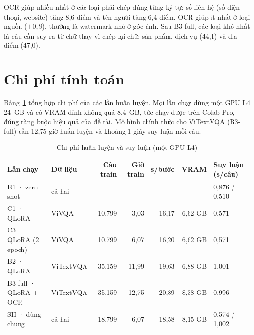 OCR giúp nhiều nhất ở các loại phải chép đúng từng ký tự: số liên hệ (số điện
thoại, website) tăng 8,6 điểm và tên người tăng 6,4 điểm. OCR giúp ít nhất ở loại
nguồn ($+0{,}9$), thường là watermark nhỏ ở góc ảnh. Sau B3-full, các loại khó
nhất là câu cần suy ra từ chữ thay vì chép lại chữ: sản phẩm, dịch vụ (44,1) và
địa điểm (47,0).

\section{Chi phí tính toán}
\label{sec:res-cost}

Bảng~\ref{tab:res-cost} tổng hợp chi phí của các lần huấn luyện. Mọi lần chạy dùng
một GPU L4 24~GB và có VRAM đỉnh không quá 8,4~GB, tức chạy được trên Colab Pro,
đúng ràng buộc hiệu quả của đề tài. Mô hình chính thức cho ViTextVQA (B3-full) cần
12,75 giờ huấn luyện và khoảng 1 giây suy luận mỗi câu.

\begin{table}[htbp]
\caption{Chi phí huấn luyện và suy luận (một GPU L4)}
\label{tab:res-cost}
\centering
\footnotesize
\begin{tabular}{p{}p{}rrrrp{}}
\toprule
\raggedright \textbf{Lần chạy} & \raggedright \textbf{Dữ liệu} & \raggedright \textbf{Câu train} & \raggedright \textbf{Giờ train} & \raggedright \textbf{s/bước} & \raggedright \textbf{VRAM} & \raggedright \textbf{Suy luận (s/câu)} \tabularnewline
\midrule
\raggedright B1 · zero-shot & \raggedright cả hai & \raggedright --- & \raggedright --- & \raggedright --- & \raggedright --- & \raggedright 0,876 / 0,510 \tabularnewline
\raggedright C1 · QLoRA & \raggedright ViVQA & \raggedright 10.799 & \raggedright 3,03 & \raggedright 16,17 & \raggedright 6,62 GB & \raggedright 0,571 \tabularnewline
\raggedright C3 · QLoRA (2 epoch) & \raggedright ViVQA & \raggedright 10.799 & \raggedright 6,07 & \raggedright 16,20 & \raggedright 6,62 GB & \raggedright 0,571 \tabularnewline
\raggedright B2 · QLoRA & \raggedright ViTextVQA & \raggedright 35.159 & \raggedright 11,99 & \raggedright 19,63 & \raggedright 6,88 GB & \raggedright 1,001 \tabularnewline
\raggedright B3-full · QLoRA + OCR & \raggedright ViTextVQA & \raggedright 35.159 & \raggedright 12,75 & \raggedright 20,89 & \raggedright 8,38 GB & \raggedright 0,996 \tabularnewline
\raggedright SH · dùng chung & \raggedright cả hai & \raggedright 18.799 & \raggedright 6,07 & \raggedright 18,58 & \raggedright 8,15 GB & \raggedright 0,574 / 1,002 \tabularnewline
\bottomrule
\end{tabular}
\end{table}

